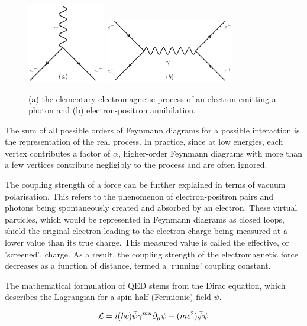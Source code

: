 \begin{figure}[hbtp]
   \centering
     \includegraphics[width=0.3\textwidth]{Chapters/03_Theory/Images/e_e_gamma}\hfill
     \includegraphics[width=0.5\textwidth]{Chapters/03_Theory/Images/e_e_gamma_e_e}
     \caption[Elementary electromagnetic processes.]{(a) the elementary electromagnetic process of an electron
     emitting a photon and (b) electron-positron annihilation.}
     \label{fig:qed_processes}
\end{figure}

The sum of all possible orders of Feynmann diagrams for a possible interaction is the representation of the
real process. In practice, since at low energies, each vertex contributes a factor of $\alpha$, higher-order
Feynmann diagrams with more than a few vertices contribute negligibly to the process and are often ignored.

The coupling strength of a force can be further explained in terms of vacuum polarisation. This refers to the
phenomenon of electron-positron pairs and photons being spontaneously created and absorbed by an electron.
These virtual particles, which would be represented in Feynmann diagrams as closed loops, shield the original
electron leading to the electron charge being measured at a lower value than its true charge. This measured
value is called the effective, or 'screened', charge. As a result, the coupling strength of the
electromagnetic force decreases as a function of distance, termed a `running' coupling constant.

The mathematical formulation of QED stems from the Dirac equation, which describes the Lagrangian for a
spin-half (Fermionic) field $\psi$.

\begin{equation}
\mathcal{L} = i (\hbar c) \bar{\psi} \gamma^{mu} \partial_{\mu} \psi - (mc^{2}) \bar{\psi} \psi
\end{equation}

